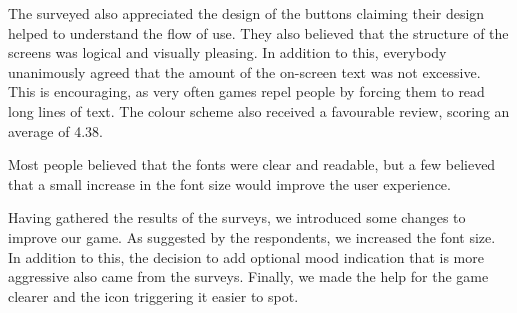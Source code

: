 The surveyed also appreciated the design of the buttons claiming their design helped to understand the flow of use.
They also believed that the structure of the screens was logical and visually pleasing. In addition to this, everybody unanimously agreed that the amount of the on-screen text was not excessive. This is encouraging, as very often games repel people by forcing them to read long lines of text. The colour scheme also received a favourable review, scoring an average of 4.38.

Most people believed that the fonts were clear and readable, but a few believed that a small increase in the font size would improve the user experience. 

Having gathered the results of the surveys, we introduced some changes to improve our game. As suggested by the respondents, we increased the font size. In addition to this, the decision to add optional mood indication that is more aggressive also came from the surveys. Finally, we made the help for the game clearer and the icon triggering it easier to spot.
